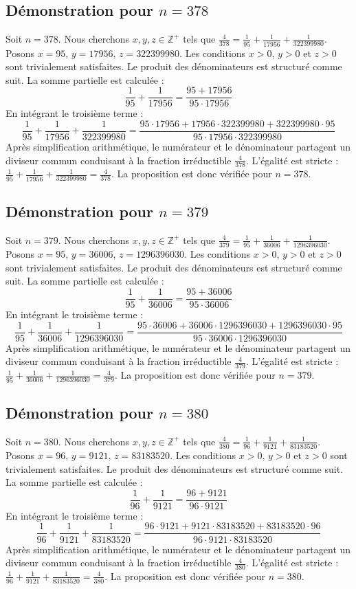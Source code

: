 \documentclass[11pt,a4paper]{article}
\begin{document}
\subsection{Démonstration pour $n = 378$}
Soit $n = 378$. Nous cherchons $x, y, z \in \mathbb{Z}^{+}$ tels que $\frac{4}{378} = \frac{1}{95} + \frac{1}{17956} + \frac{1}{322399980}$.
Posons $x = 95$, $y = 17956$, $z = 322399980$.
Les conditions $x > 0$, $y > 0$ et $z > 0$ sont trivialement satisfaites.
Le produit des dénominateurs est structuré comme suit. La somme partielle est calculée :
$$ \frac{1}{95} + \frac{1}{17956} = \frac{95+17956}{95 \cdot 17956} $$
En intégrant le troisième terme :
$$ \frac{1}{95} + \frac{1}{17956} + \frac{1}{322399980} = \frac{95 \cdot 17956 + 17956 \cdot 322399980 + 322399980 \cdot 95}{95 \cdot 17956 \cdot 322399980} $$
Après simplification arithmétique, le numérateur et le dénominateur partagent un diviseur commun conduisant à la fraction irréductible $\frac{4}{378}$.
L'égalité est stricte : $\frac{1}{95} + \frac{1}{17956} + \frac{1}{322399980} = \frac{4}{378}$.
La proposition est donc vérifiée pour $n = 378$.
\subsection{Démonstration pour $n = 379$}
Soit $n = 379$. Nous cherchons $x, y, z \in \mathbb{Z}^{+}$ tels que $\frac{4}{379} = \frac{1}{95} + \frac{1}{36006} + \frac{1}{1296396030}$.
Posons $x = 95$, $y = 36006$, $z = 1296396030$.
Les conditions $x > 0$, $y > 0$ et $z > 0$ sont trivialement satisfaites.
Le produit des dénominateurs est structuré comme suit. La somme partielle est calculée :
$$ \frac{1}{95} + \frac{1}{36006} = \frac{95+36006}{95 \cdot 36006} $$
En intégrant le troisième terme :
$$ \frac{1}{95} + \frac{1}{36006} + \frac{1}{1296396030} = \frac{95 \cdot 36006 + 36006 \cdot 1296396030 + 1296396030 \cdot 95}{95 \cdot 36006 \cdot 1296396030} $$
Après simplification arithmétique, le numérateur et le dénominateur partagent un diviseur commun conduisant à la fraction irréductible $\frac{4}{379}$.
L'égalité est stricte : $\frac{1}{95} + \frac{1}{36006} + \frac{1}{1296396030} = \frac{4}{379}$.
La proposition est donc vérifiée pour $n = 379$.
\subsection{Démonstration pour $n = 380$}
Soit $n = 380$. Nous cherchons $x, y, z \in \mathbb{Z}^{+}$ tels que $\frac{4}{380} = \frac{1}{96} + \frac{1}{9121} + \frac{1}{83183520}$.
Posons $x = 96$, $y = 9121$, $z = 83183520$.
Les conditions $x > 0$, $y > 0$ et $z > 0$ sont trivialement satisfaites.
Le produit des dénominateurs est structuré comme suit. La somme partielle est calculée :
$$ \frac{1}{96} + \frac{1}{9121} = \frac{96+9121}{96 \cdot 9121} $$
En intégrant le troisième terme :
$$ \frac{1}{96} + \frac{1}{9121} + \frac{1}{83183520} = \frac{96 \cdot 9121 + 9121 \cdot 83183520 + 83183520 \cdot 96}{96 \cdot 9121 \cdot 83183520} $$
Après simplification arithmétique, le numérateur et le dénominateur partagent un diviseur commun conduisant à la fraction irréductible $\frac{4}{380}$.
L'égalité est stricte : $\frac{1}{96} + \frac{1}{9121} + \frac{1}{83183520} = \frac{4}{380}$.
La proposition est donc vérifiée pour $n = 380$.
\end{document}
